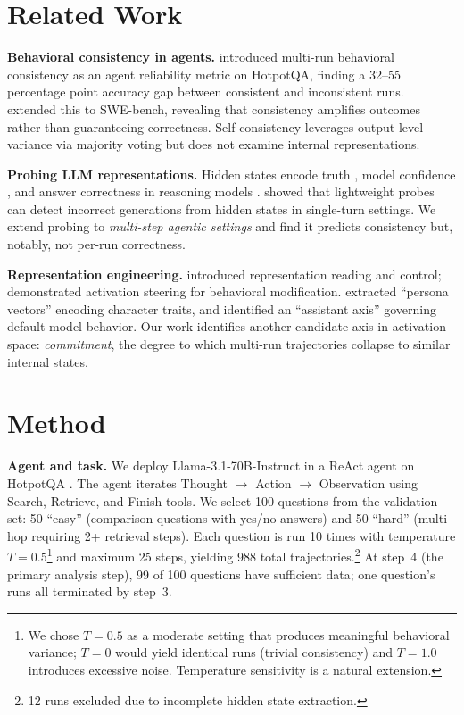 \documentclass{article}
\begin{document}
\section{Related Work}

\textbf{Behavioral consistency in agents.} \citet{anonymous2026a} introduced multi-run behavioral consistency as an agent reliability metric on HotpotQA, finding a 32--55 percentage point accuracy gap between consistent and inconsistent runs. \citet{anonymous2026b} extended this to SWE-bench, revealing that consistency amplifies outcomes rather than guaranteeing correctness. Self-consistency \citep{wang2023selfconsistency} leverages output-level variance via majority voting but does not examine internal representations.

\textbf{Probing LLM representations.} Hidden states encode truth \citep{burns2023discovering, marks2024geometry}, model confidence \citep{kadavath2022language}, and answer correctness in reasoning models \citep{stickland2024reasoning}. \citet{gnosis} showed that lightweight probes can detect incorrect generations from hidden states in single-turn settings. We extend probing to \emph{multi-step agentic settings} and find it predicts consistency but, notably, not per-run correctness.

\textbf{Representation engineering.} \citet{zou2023repe} introduced representation reading and control; \citet{turner2023steering} demonstrated activation steering for behavioral modification. \citet{anthropic_persona} extracted ``persona vectors'' encoding character traits, and \citet{anthropic_axis} identified an ``assistant axis'' governing default model behavior. Our work identifies another candidate axis in activation space: \emph{commitment}, the degree to which multi-run trajectories collapse to similar internal states.

\section{Method}

\textbf{Agent and task.} We deploy Llama-3.1-70B-Instruct \citep{llama3} in a ReAct \citep{react} agent on HotpotQA \citep{hotpotqa}. The agent iterates Thought $\rightarrow$ Action $\rightarrow$ Observation using Search, Retrieve, and Finish tools. We select 100 questions from the validation set: 50 ``easy'' (comparison questions with yes/no answers) and 50 ``hard'' (multi-hop requiring 2+ retrieval steps). Each question is run 10 times with temperature $T{=}0.5$\footnote{We chose $T{=}0.5$ as a moderate setting that produces meaningful behavioral variance; $T{=}0$ would yield identical runs (trivial consistency) and $T{=}1.0$ introduces excessive noise. Temperature sensitivity is a natural extension.} and maximum 25 steps, yielding 988 total trajectories.\footnote{12 runs excluded due to incomplete hidden state extraction.} At step~4 (the primary analysis step), 99 of 100 questions have sufficient data; one question's runs all terminated by step~3.
\end{document}
